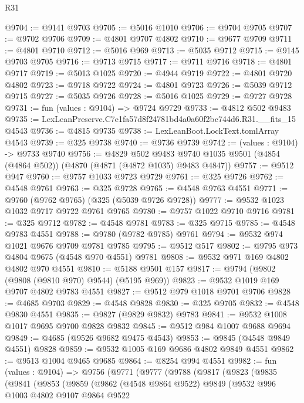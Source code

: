 \begin{lexlean}{R31}
\begin{coremodule}
@9704 := @9141 @9703
@9705 := @5016 @1010
@9706 := @9704 @9705
@9707 := @9702 @9706
@9709 := @4801 @9707 @4802
@9710 := @9677 @9709
@9711 := @4801 @9710
@9712 := @5016 @969
@9713 := @5035 @9712
@9715 := @9145 @9703 @9705
@9716 := @9713 @9715
@9717 := @9711 @9716
@9718 := @4801 @9717
@9719 := @5013 @1025
@9720 := @4944 @9719
@9722 := @4801 @9720 @4802
@9723 := @9718 @9722
@9724 := @4801 @9723
@9726 := @5039 @9712 @9715
@9727 := @5035 @9726
@9728 := @5016 @1025
@9729 := @9727 @9728
@9731 := fun (values : @9104) => @9724 @9729
@9733 := @4812 @502 @9483
@9735 := LexLeanPreserve.C7e1fa57d8f24781bd4a0a60f2bc744d6.R31.__fits_15 @4543
@9736 := @4815 @9735
@9738 := LexLeanBoot.LockText.tomlArray @4543
@9739 := @325 @9738
@9740 := @9736 @9739
@9742 := (values : @9104) -> @9733 @9740
@9756 := @4829
    @502
    @9483
    @9740
    @1035
    @9501
    (@4854 (@4864 @502))
    (@4870 (@4871 (@4872 @1035) @9483 @4847))
@9757 := @9512 @947
@9760 := @9757 @1033 @9723 @9729
@9761 := @325 @9726
@9762 := @4548 @9761
@9763 := @325 @9728
@9765 := @4548 @9763 @4551
@9771 := @9760 (@9762 @9765) (@325 (@5039 @9726 @9728))
@9777 := @9532 @1023 @1032 @9717 @9722 @9761 @9765
@9780 := @9757 @1022 @9710 @9716
@9781 := @325 @9712
@9782 := @4548 @9781
@9783 := @325 @9715
@9785 := @4548 @9783 @4551
@9788 := @9780 (@9782 @9785) @9761
@9794 := @9532 @974 @1021 @9676 @9709 @9781 @9785
@9795 := @9512 @517
@9802 := @9795 @973 @4804 @9675 (@4548 @970 @4551) @9781
@9808 := @9532 @971 @169 @4802 @4802 @970 @4551
@9810 := @5188 @9501 @157
@9817 := @9794 (@9802 (@9808 (@9810 @970) @9544) (@5195 @969))
@9823 := @9532 @1019 @169 @9707 @4802 @9783 @4551
@9827 := @9512 @979 @1018 @9701 @9706
@9828 := @4685 @9703
@9829 := @4548 @9828
@9830 := @325 @9705
@9832 := @4548 @9830 @4551
@9835 := @9827 (@9829 @9832) @9783
@9841 := @9532 @1008 @1017 @9695 @9700 @9828 @9832
@9845 := @9512 @984 @1007 @9688 @9694
@9849 := @4685 (@9526 @9682 @9475 @4543)
@9853 := @9845 (@4548 @9849 @4551) @9828
@9859 := @9532 @1005 @169 @9686 @4802 @9849 @4551
@9862 := @9513 @1004 @9465 @9685
@9864 := @8254 @994 @4551
@9982 := fun (values : @9104) =>
  @9756
    (@9771
      (@9777
        (@9788
          (@9817
            (@9823
              (@9835
                (@9841
                  (@9853
                    (@9859
                      (@9862
                        (@4548 @9864 @9522)
                        @9849
                        (@9532
                          @996
                          @1003
                          @4802
                          @9107
                          @9864
                          @9522

\end{coremodule}
\end{lexlean}
